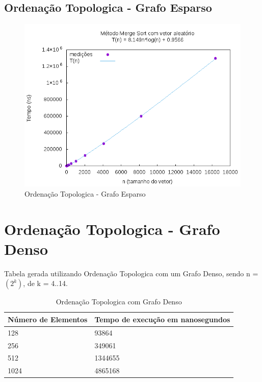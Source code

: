 \documentclass[12pt,a4paper,twoside]{report}
\begin{document}
\subsection{Ordenação Topologica - Grafo Esparso}
\begin{figure}[H]
    \centering
    \includegraphics[width=0.7\linewidth]{graficos/MergeSort/vIntAleatorio/vIntAleatorio.png}
  \caption{Ordenação Topologica - Grafo Esparso}
\end{figure}

\section{Ordenação Topologica - Grafo Denso}
Tabela gerada utilizando Ordenação Topologica com um Grafo Denso, sendo n = $(2^k)$, de k = 4..14.
\begin{table}[H]
\centering
\caption{Ordenação Topologica com Grafo Denso}
\label{my-label}
\begin{tabular}{|l|l|}
\hline
\multicolumn{1}{|c|}{\textbf{Número de Elementos}} & \multicolumn{1}{c|}{\textbf{Tempo de execução em nanosegundos}} \\ \hline
128 & 93864 \\ \hline
256 & 349061 \\ \hline
512 & 1344655 \\ \hline
1024 & 4865168 \\ \hline
\end{tabular}
\end{table}
\end{document}
